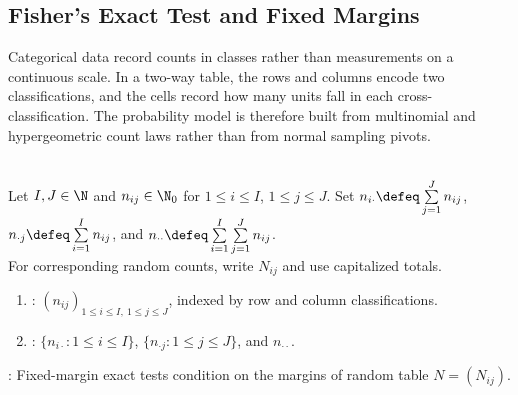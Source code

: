 \subsection{Fisher's Exact Test and Fixed Margins}

Categorical data record counts in classes rather than measurements on a continuous scale.  In a two-way table, the rows and columns encode two classifications, and the cells record how many units fall in each cross-classification.  The probability model is therefore built from multinomial and hypergeometric count laws rather than from normal sampling pivots.

\begin{definition} \label{def:two-way-contingency-table-counts} \\
Let $I,J\in\N$ and $n_{ij}\in\N_0$ for $1\leq i\leq I$, $1\leq j\leq J$. Set $n_{i\cdot}\defeq\sum\limits_{j=1}^{J}n_{ij}$, $n_{\cdot j}\defeq\sum\limits_{i=1}^{I}n_{ij}$, and $n_{\cdot\cdot}\defeq\sum\limits_{i=1}^{I}\sum\limits_{j=1}^{J}n_{ij}$.\\
For corresponding random counts, write $N_{ij}$ and use capitalized totals.
\begin{enumerate}[label=(\roman*)]
\setlength{\itemsep}{0pt}
\item {}: $(n_{ij})_{1\leq i\leq I,\ 1\leq j\leq J}$, indexed by row and column classifications.
\item {}: $\{n_{i\cdot}:1\leq i\leq I\}$, $\{n_{\cdot j}:1\leq j\leq J\}$, and $n_{\cdot\cdot}$.
\end{enumerate}
: Fixed-margin exact tests condition on the margins of random table $N=(N_{ij})$.
\end{definition}

